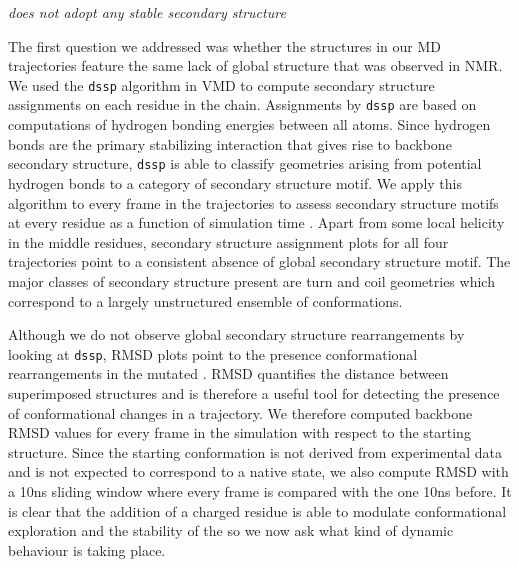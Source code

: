 {\it \gct does not adopt any stable secondary structure}

The first question we addressed was whether the structures in our MD trajectories feature the same lack of global structure that was observed in NMR. We used the \texttt{dssp} algorithm  in VMD to compute secondary structure assignments on each residue in the chain. Assignments by \texttt{dssp} are based on computations of hydrogen bonding energies between all atoms. Since hydrogen bonds are the primary stabilizing interaction that gives rise to backbone secondary structure, \texttt{dssp} is able to classify geometries arising from potential hydrogen bonds to a category of secondary structure motif. We apply this algorithm to every frame in the trajectories to assess secondary structure motifs at every residue as a function of simulation time . Apart from some local helicity in the middle residues, secondary structure assignment plots for all four trajectories point to a consistent absence of global secondary structure motif. The major classes of secondary structure present are turn and coil geometries which correspond to a largely unstructured ensemble of conformations. 

\begin{figure}
	\centering     %
	\subfigure[WT Run 1]{\label{fig:a}\texttt{[image: wt\_ss]}}
	\subfigure[YD Run 1]{\label{fig:b}\texttt{[image: yd\_ss]}}
\end{figure}	


Although we do not observe global secondary structure rearrangements by looking at \texttt{dssp}, RMSD plots point to the presence conformational rearrangements in the mutated \gct. RMSD quantifies the distance between superimposed structures and is therefore a useful tool for detecting the presence of conformational changes in a trajectory. We therefore computed backbone RMSD values for every frame in the simulation with respect to the starting structure. Since the starting conformation is not derived from experimental data and is not expected to correspond to a native state, we also compute RMSD with a 10ns sliding window where every frame is compared with the one 10ns before.  It is clear that the addition of a charged residue is able to modulate conformational exploration and the stability of the \gct so we now ask what kind of dynamic behaviour is taking place. 



